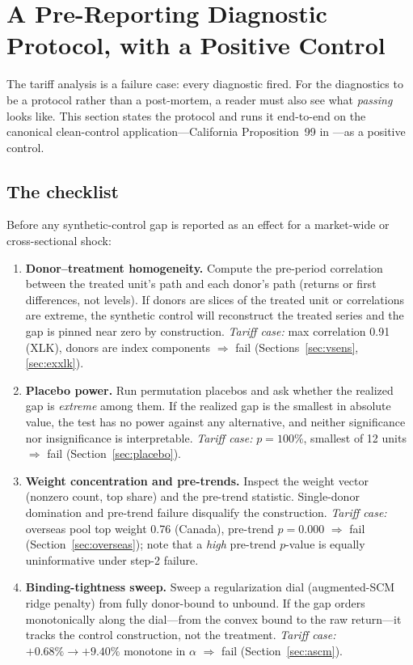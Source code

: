 \documentclass[11pt,a4paper]{article}
\begin{document}
\section{A Pre-Reporting Diagnostic Protocol, with a Positive Control}
\label{sec:protocol}

The tariff analysis is a failure case: every diagnostic fired. For the
diagnostics to be a protocol rather than a post-mortem, a reader must also
see what \emph{passing} looks like. This section states the protocol and
runs it end-to-end on the canonical clean-control application---California
Proposition~99 in \citet{abadie2010}---as a positive control.

\subsection{The checklist}\label{sec:checklist}

Before any synthetic-control gap is reported as an effect for a
market-wide or cross-sectional shock:

\begin{enumerate}
  \item \textbf{Donor--treatment homogeneity.} Compute the pre-period
  correlation between the treated unit's path and each donor's path
  (returns or first differences, not levels). If donors are slices of the
  treated unit or correlations are extreme, the synthetic control will
  reconstruct the treated series and the gap is pinned near zero by
  construction. \emph{Tariff case:} max correlation 0.91 (XLK), donors
  are index components $\Rightarrow$ fail
  (Sections~\ref{sec:vsens}, \ref{sec:exxlk}).
  \item \textbf{Placebo power.} Run permutation placebos and ask whether
  the realized gap is \emph{extreme} among them. If the realized gap is
  the smallest in absolute value, the test has no power against any
  alternative, and neither significance nor insignificance is
  interpretable. \emph{Tariff case:} $p=100\%$, smallest of 12 units
  $\Rightarrow$ fail (Section~\ref{sec:placebo}).
  \item \textbf{Weight concentration and pre-trends.} Inspect the weight
  vector (nonzero count, top share) and the pre-trend statistic.
  Single-donor domination and pre-trend failure disqualify the
  construction. \emph{Tariff case:} overseas pool top weight 0.76
  (Canada), pre-trend $p=0.000$ $\Rightarrow$ fail
  (Section~\ref{sec:overseas}); note that a \emph{high} pre-trend
  $p$-value is equally uninformative under step-2 failure.
  \item \textbf{Binding-tightness sweep.} Sweep a regularization dial
  (augmented-SCM ridge penalty) from fully donor-bound to unbound. If the
  gap orders monotonically along the dial---from the convex bound to the
  raw return---it tracks the control construction, not the treatment.
  \emph{Tariff case:} $+0.68\%\to+9.40\%$ monotone in $\alpha$
  $\Rightarrow$ fail (Section~\ref{sec:ascm}).
\end{enumerate}
\end{document}
